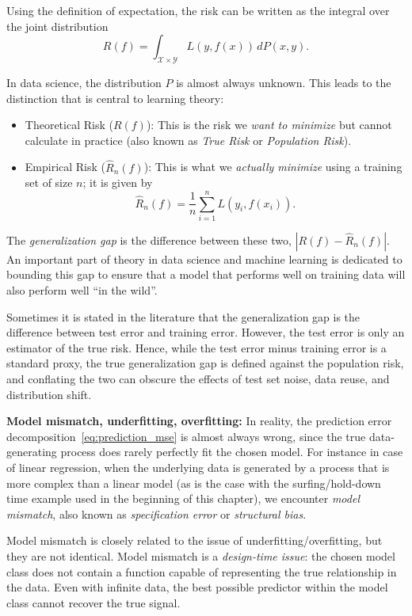 Using the definition of expectation, the risk can be written as the integral over the joint distribution
$$R(f) = \int_{\mathcal{X} \times \mathcal{Y}} L(y, f(x)) \, dP(x, y).$$

In data science, the distribution $P$ is almost always unknown. This leads to the distinction that is central to learning theory:
\begin{itemize}
\item Theoretical Risk ($R(f)$): This is the risk we {\em want to minimize} but cannot calculate in practice (also known as {\em True Risk} or {\em Population Risk}). 
\item Empirical Risk ($\hat{R}_n(f)$): This is what we {\em actually minimize} using a training set of size $n$; it is given by
$$\hat{R}_n(f) = \frac{1}{n} \sum_{i=1}^n L(y_i, f(x_i)).$$
\end{itemize}

The {\em generalization gap} is the difference between these two, $|R(f) - \hat{R}_n(f)|$. An important part of theory in data science and machine learning is dedicated to bounding this gap to ensure that a model that performs well on training data will also perform well ``in the wild''.

Sometimes it is stated in the literature that the generalization gap is the difference between test error and training error. However, the test error  is only an estimator of the true risk. Hence, while the test error minus training error is a standard proxy, the true generalization gap is defined against the population risk, and conflating the two can obscure the effects of test set noise, data reuse, and distribution shift.


\medskip
\noindent
\textbf{Model mismatch, underfitting, overfitting:}
In reality, the prediction error decomposition~\eqref{eq:prediction_mse} is almost always wrong, since the true data-generating process does rarely perfectly fit the chosen model. For instance in case of linear regression,  
when the underlying data is generated by a process that is more complex than a linear model (as is  the case with the surfing/hold-down time example used in the beginning of this chapter), we encounter {\em model mismatch}, also known as {\em specification error} or {\em structural bias}. 


Model mismatch is closely related to the issue of underfitting/overfitting, but they are not identical.
Model mismatch is a {\em design-time issue}: the chosen model class does not contain a function capable of representing the true relationship in the data. Even with infinite data, the best possible predictor within the model class cannot recover the true signal.

